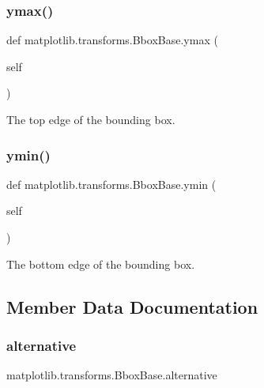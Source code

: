 \subsubsection{\texorpdfstring{ymax()}{ymax()}}
{\footnotesize\ttfamily def matplotlib.\+transforms.\+Bbox\+Base.\+ymax (\begin{DoxyParamCaption}\item[{}]{self }\end{DoxyParamCaption})}

\begin{DoxyVerb}The top edge of the bounding box.\end{DoxyVerb}
 \mbox{\label{classmatplotlib_1_1transforms_1_1BboxBase_ae709dcbfafe5e0ead4d41767b1a6b118}} 
\subsubsection{\texorpdfstring{ymin()}{ymin()}}
{\footnotesize\ttfamily def matplotlib.\+transforms.\+Bbox\+Base.\+ymin (\begin{DoxyParamCaption}\item[{}]{self }\end{DoxyParamCaption})}

\begin{DoxyVerb}The bottom edge of the bounding box.\end{DoxyVerb}
 

\subsection{Member Data Documentation}
\mbox{\label{classmatplotlib_1_1transforms_1_1BboxBase_a46108795019176d0e54543a4b6306927}} 
\subsubsection{\texorpdfstring{alternative}{alternative}}
{\footnotesize\ttfamily matplotlib.\+transforms.\+Bbox\+Base.\+alternative\hspace{0.3cm}{\ttfamily [static]}}

